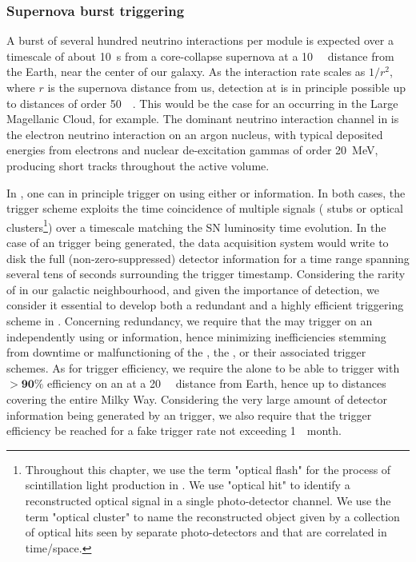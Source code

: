 \subsubsection{Supernova burst triggering}

A burst of several hundred neutrino interactions per \dune {} module is expected over a timescale of about \SI{10}{\s} from a core-collapse supernova at a \SI{10}{\kilo\parsec} distance from the Earth, near the center of our galaxy. As the  interaction rate scales as $1/r^2$, where $r$ is the supernova distance from us,  detection at \dune is in principle possible up to distances of order \SI{50}{\kilo\parsec}. This would be the case for an  occurring in the Large Magellanic Cloud, for example. The dominant neutrino interaction channel in \dune is the  electron neutrino interaction on an argon nucleus, with typical deposited energies from electrons and nuclear de-excitation gammas of order \SI{20}{\MeV}, producing short tracks throughout the  active volume.

In \dune, one can in principle trigger on  using either  or  information. In both cases, the trigger scheme exploits the time coincidence of multiple signals ( stubs or  optical clusters\footnote{Throughout this chapter, we use the term "optical flash" for the process of scintillation light production in . We use "optical hit" to identify a reconstructed optical signal in a single photo-detector channel. We use the term "optical cluster" to name the reconstructed object given by a collection of optical hits seen by separate photo-detectors and that are correlated in time/space.}) over a timescale matching the SN luminosity time evolution. In the case of an  trigger being generated, the data acquisition system would write to disk the full (non-zero-suppressed) detector information for a time range spanning several tens of seconds surrounding the trigger timestamp. Considering the rarity of  in our galactic neighbourhood, and given the importance of  detection, we consider it essential to develop both a redundant and a highly efficient  triggering scheme in . Concerning redundancy, we require that the \dune {} may trigger on an  independently using  or  information, hence minimizing  inefficiencies stemming from downtime or malfunctioning of the , the , or their associated trigger schemes. As for trigger efficiency, we require the  alone to be able to trigger with $\boldsymbol{>90\%}$ efficiency on an  at a \SI{20}{\kilo\parsec} distance from Earth, hence up to distances covering the entire Milky Way. Considering the very large amount of detector information being generated by an  trigger, we also require that the  trigger efficiency be reached for a fake trigger rate not exceeding \SI{1}{\per month}.

